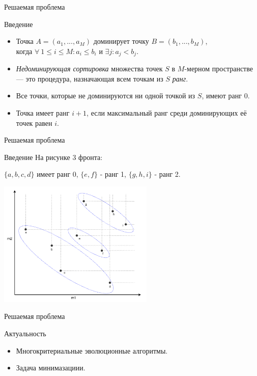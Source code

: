 \documentclass{beamer}
\begin{document}
\begin{frame}{Решаемая проблема}
\begin{block}{Введение}
\begin{itemize}
\item Точка $A=(a_1,...,a_M)$ доминирует точку $B=(b_1,...,b_M)$, \\
когда $\forall ~ 1 \leq i \leq M : a_i \leq b_i$ и $\exists j : a_j < b_j $.
\item \textit{Недоминирующая сортировка} множества точек $S$ в $M$-мерном пространстве — это процедура, назначающая всем точкам из $S$ \textit{ранг}.
\item Все точки, которые не доминируются ни одной точкой из $S$, имеют ранг 0.
\item Точка имеет ранг $i+1$, если максимальный ранг среди доминирующих  её точек равен $i$.
\end{itemize}
\end{block}
\end{frame}


\begin{frame}{Решаемая проблема}
\begin{block}{Введение}
На рисунке 3 фронта: 

$\{a, b, c, d\}$ имеет ранг 0, $\{e, f\}$ - ранг 1, $\{g, h, i\}$ - ранг 2.
\begin{center}
\includegraphics*[height=6cm]{pic/non_dominated_sort.png}
\end{center}
\end{block}
\end{frame}

\begin{frame}{Решаемая проблема}
\begin{block}{Актуальность}
\begin{itemize}
\item Многокритериальные эволюционные алгоритмы. 
\item Задача минимазациии.
\end{itemize}
\end{block}
\end{frame}
\end{document}

